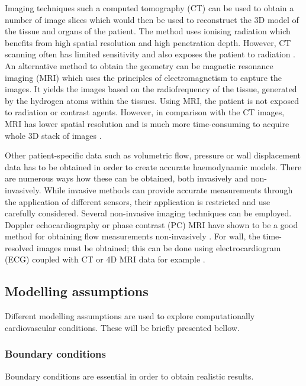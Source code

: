 Imaging techniques such a computed tomography (CT) can be used to obtain a number of image slices which would then be used to reconstruct the 3D model of the tissue and organs of the patient. The method  uses ionising radiation which benefits from high spatial resolution and high penetration depth. However, CT scanning often has limited sensitivity and also exposes the patient to radiation \cite{Saremi2015CoronaryCT}. An alternative method to obtain the geometry can be magnetic resonance imaging (MRI) which uses the principles of electromagnetism to capture the images. It yields the images based on the radiofrequency of the tissue, generated by the hydrogen atoms within the tissues. Using MRI, the patient is not exposed to radiation or contrast agents. However, in comparison with the CT images, MRI has lower spatial resolution and is much more time-consuming to acquire whole 3D stack of images \cite{Maurovich-Horvat2012DifferentiationHearts, Karmonik2008ComputationalRates}.\par

Other patient-specific data such as volumetric flow, pressure  or wall displacement data has to be obtained in order to create accurate haemodynamic models. There are numerous ways how these can be obtained, both invasively and non-invasively. While invasive methods can provide accurate measurements through the application of different sensors, their application is restricted and use carefully considered. Several non-invasive imaging techniques can be employed. Doppler echocardiography or phase contrast (PC) MRI have shown to be a good method for obtaining flow measurements non-invasively \cite{Whitlock2015NoninvasiveAorta}. For wall, the time-resolved images must be obtained; this can be done using electrocardiogram (ECG) coupled with CT or 4D MRI data for example \cite{Bonfanti2017ComputationalData,Alimohammadi2015AorticUnderstanding}.

\subsection{Modelling assumptions}
Different modelling assumptions are used to explore computationally cardiovascular conditions. These will be briefly presented bellow.

\subsubsection{Boundary conditions}
Boundary conditions are essential in order to obtain realistic results.  \par


